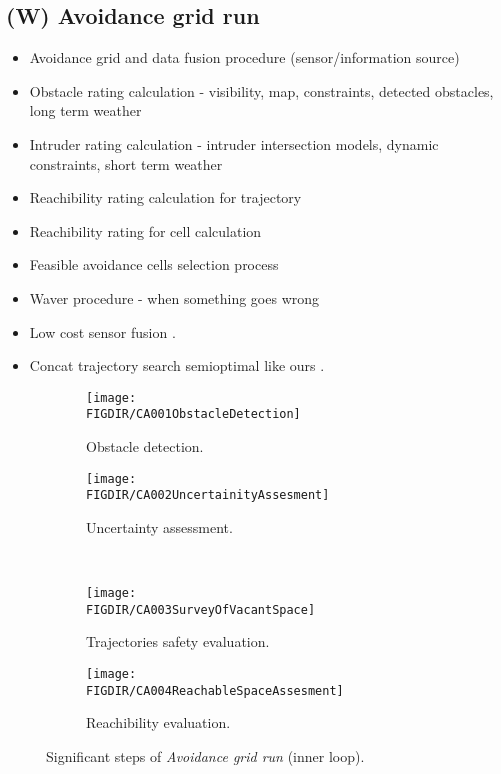 \subsection{(W) Avoidance grid run}\label{s:aviudabceGridRun}
    \begin{itemize}
        \item Avoidance grid and data fusion procedure (sensor/information source)
        \item Obstacle rating calculation - visibility, map, constraints, detected obstacles, long term weather
        \item Intruder rating calculation - intruder intersection models, dynamic constraints, short term weather
        \item Reachibility rating calculation for trajectory
        \item Reachibility rating for cell calculation
        \item Feasible avoidance cells selection process
        \item Waver procedure - when something goes wrong
		\item Low cost sensor fusion \cite{sabatini2013low}.
		\item Concat trajectory search semioptimal like ours \cite{shaw1998using}.
    \end{itemize}
    \begin{figure}[H]
    \centering
        \begin{subfigure}{0.48\textwidth}
            \texttt{[image: \\FIGDIR/CA001ObstacleDetection]}
            \caption{Obstacle detection.}
            \label{fig:obstacleDetectionAvoidanceGrid}
        \end{subfigure}
        \begin{subfigure}{0.48\textwidth}
            \texttt{[image: \\FIGDIR/CA002UncertainityAssesment]} 
            \caption{Uncertainty assessment.}
            \label{fig:uncertainityAssesmentAvoidanceGrid}
        \end{subfigure}
        \\
        \begin{subfigure}{0.48\textwidth}
            \texttt{[image: \\FIGDIR/CA003SurveyOfVacantSpace]} 
            \caption{Trajectories safety evaluation.}
            \label{fig:trajectoriesSafetyEvaluationAvoidanceGrid}
        \end{subfigure}
        \begin{subfigure}{0.48\textwidth}
            \texttt{[image: \\FIGDIR/CA004ReachableSpaceAssesment]} 
            \caption{Reachibility evaluation.}
            \label{fig:reachibilityAssessmentAvoidanceGrid}
        \end{subfigure}
        \caption{Significant steps of \emph{Avoidance grid run} (inner loop).}
        \label{fig:significantStepsofAvoidanceGridRun}
    \end{figure}

